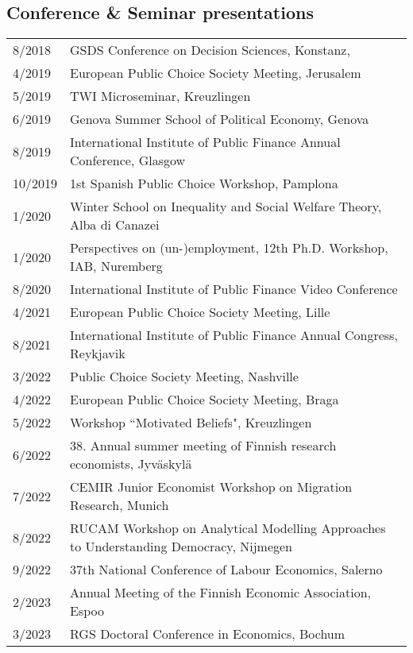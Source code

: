 \documentclass[16pt]{article}
\begin{document}
\subsection*{Conference \& Seminar presentations}
\begin{tabular}{@{}p{0.5in}p{6in}}
8/2018             & GSDS Conference on Decision Sciences, Konstanz,\\
4/2019             & European Public Choice Society Meeting, Jerusalem\\
5/2019             & TWI Microseminar, Kreuzlingen \\
6/2019             & Genova Summer School of Political Economy, Genova \\
8/2019             & International Institute of Public Finance Annual Conference, Glasgow \\
10/2019           & 1st Spanish Public Choice Workshop, Pamplona \\
1/2020             & Winter School on Inequality and Social Welfare Theory, Alba di Canazei \\
1/2020             & Perspectives on (un-)employment, 12th Ph.D. Workshop, IAB, Nuremberg \\
8/2020             & International Institute of Public Finance Video Conference \\
4/2021             & European Public Choice Society Meeting, Lille \\
8/2021             & International Institute of Public Finance Annual Congress, Reykjavik \\
3/2022             & Public Choice Society Meeting, Nashville \\
4/2022             & European Public Choice Society Meeting, Braga \\
5/2022             & Workshop ``Motivated Beliefs", Kreuzlingen \\
6/2022             & 38. Annual summer meeting of Finnish research economists, Jyväskylä \\
7/2022             & CEMIR Junior Economist Workshop on Migration Research, Munich \\
8/2022             & RUCAM Workshop on Analytical Modelling Approaches to Understanding Democracy, Nijmegen \\
9/2022             & 37th National Conference of Labour Economics, Salerno \\
2/2023             & Annual Meeting of the Finnish Economic Association, Espoo \\
3/2023             & RGS Doctoral Conference in Economics, Bochum \\

\end{tabular}
\end{document}
